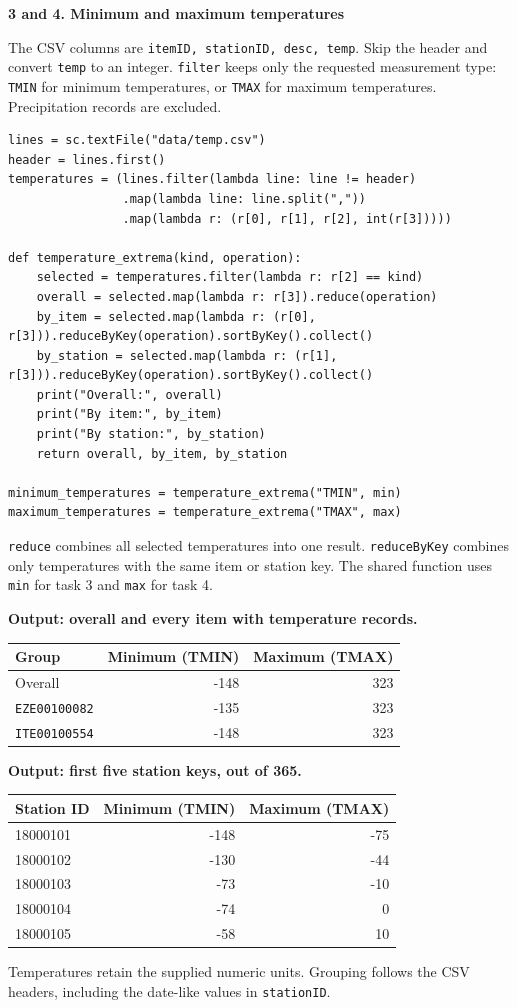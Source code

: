 \documentclass[10pt,a4paper]{article}
\newcommand{\task}[1]{\medskip\textbf{#1}\par}
\begin{document}
\newpage
\task{3 and 4. Minimum and maximum temperatures}
The CSV columns are \texttt{itemID, stationID, desc, temp}.
Skip the header and convert \texttt{temp} to an integer.
\texttt{filter} keeps only the requested measurement type:
\texttt{TMIN} for minimum temperatures, or \texttt{TMAX} for maximum temperatures.
Precipitation records are excluded.
\begin{lstlisting}
lines = sc.textFile("data/temp.csv")
header = lines.first()
temperatures = (lines.filter(lambda line: line != header)
                .map(lambda line: line.split(","))
                .map(lambda r: (r[0], r[1], r[2], int(r[3]))))

def temperature_extrema(kind, operation):
    selected = temperatures.filter(lambda r: r[2] == kind)
    overall = selected.map(lambda r: r[3]).reduce(operation)
    by_item = selected.map(lambda r: (r[0], r[3])).reduceByKey(operation).sortByKey().collect()
    by_station = selected.map(lambda r: (r[1], r[3])).reduceByKey(operation).sortByKey().collect()
    print("Overall:", overall)
    print("By item:", by_item)
    print("By station:", by_station)
    return overall, by_item, by_station

minimum_temperatures = temperature_extrema("TMIN", min)
maximum_temperatures = temperature_extrema("TMAX", max)
\end{lstlisting}
\texttt{reduce} combines all selected temperatures into one result.
\texttt{reduceByKey} combines only temperatures with the same item or station key.
The shared function uses \texttt{min} for task 3 and \texttt{max} for task 4.

\textbf{Output: overall and every item with temperature records.}
\begin{center}
\begin{tabular}{lrr}
\toprule
Group & Minimum (TMIN) & Maximum (TMAX) \\
\midrule
Overall & -148 & 323 \\
\texttt{EZE00100082} & -135 & 323 \\
\texttt{ITE00100554} & -148 & 323 \\
\bottomrule
\end{tabular}
\end{center}
\textbf{Output: first five station keys, out of 365.}
\begin{center}
\begin{tabular}{lrr}
\toprule
Station ID & Minimum (TMIN) & Maximum (TMAX) \\
\midrule
18000101 & -148 & -75 \\
18000102 & -130 & -44 \\
18000103 & -73 & -10 \\
18000104 & -74 & 0 \\
18000105 & -58 & 10 \\
\bottomrule
\end{tabular}
\end{center}
Temperatures retain the supplied numeric units. Grouping follows the CSV headers,
including the date-like values in \texttt{stationID}.
\end{document}
